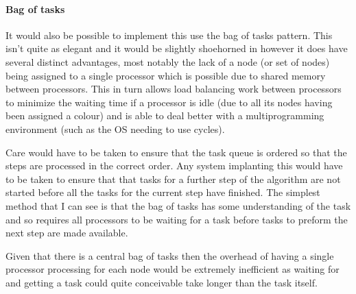 \documentclass[11pt,a4paper]{article}
\begin{document}
%

\paragraph{Bag of tasks} It would also be possible to implement this use the bag of tasks
pattern. This isn't quite as elegant and it would be slightly shoehorned
in however it does have several distinct advantages, most notably
the lack of a node (or set of nodes) being assigned to a single processor
which is possible due to shared memory between processors. This in turn allows
load balancing work between processors to minimize the waiting time if a
processor is idle (due to all its nodes having been assigned a colour) and is able
to deal better with a multiprogramming environment (such as the OS needing to use cycles).

Care would have to be taken to ensure that the task queue is ordered so
that the steps are processed in the correct order. Any system implanting
this would have to be taken to ensure that that tasks for a further step of the algorithm are not
started before all the tasks for the current step have finished.  The simplest method that I can see is that the bag of tasks has some understanding of the task and so requires all processors to be waiting for a task before tasks to preform the next step are made available.

Given that there is a central bag of tasks then the overhead of having a single 
processor processing for each node would be extremely inefficient as waiting for 
and getting a task could quite conceivable take longer than the task itself.
\end{document}
